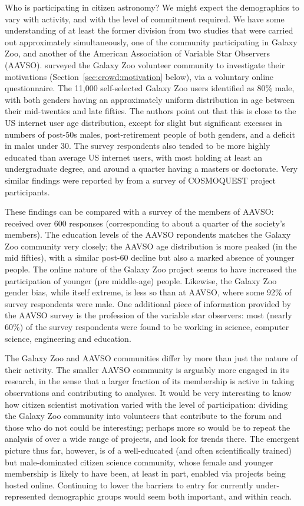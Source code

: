 \documentclass{ar2e}
\def\Sref#1{Section~\ref{#1}\xspace}
\begin{document}
Who is participating in citizen astronomy? We might expect the demographics to
vary with activity, and with the level of commitment required. We have some
understanding of at least the former division from two studies that were
carried out approximately simultaneously, one of the community  participating
in Galaxy Zoo, and another of the American Association of Variable Star
Observers (AAVSO).  \citet{Rad++2013} surveyed the Galaxy Zoo volunteer
community to investigate their motivations (\Sref{sec:crowd:motivation}
below), via a voluntary online questionnaire. The 11,000 self-selected Galaxy
Zoo users identified as 80\% male, with both genders having an approximately
uniform distribution in age between their mid-twenties and late fifties. The
authors point out that this is close to the US internet user age distribution,
except for slight but significant excesses in numbers of post-50s males,
post-retirement people of both genders, and a deficit in males under 30. The
survey respondents  also tended to be more highly educated than average US
internet users, with most holding at least an undergraduate degree, and around
a quarter having a masters or doctorate. Very similar findings were reported
by \citet{COSMOQUESTsurvey} from a survey of COSMOQUEST project participants.

These findings can be compared with a survey of the members of AAVSO:
\citet{P+P2012} received over 600 responses (corresponding to about a quarter
of the society's members). The education levels of
the AAVSO repondents matches the Galaxy Zoo community very closely; the AAVSO
age distribution is more peaked (in the mid fifties), with a similar post-60
decline but also a marked absence of younger people. The online nature of the
Galaxy Zoo project seems to have increased the participation of younger (pre
middle-age) people. Likewise, the Galaxy Zoo gender bias, while itself
extreme, is less so than at AAVSO, where some 92\% of survey respondents were
male. One additional piece of information provided by the AAVSO survey is the
profession of the variable star observers: most (nearly 60\%) of the survey
respondents were found to be working in science, computer science, engineering
and education. 

The Galaxy Zoo and AAVSO communities differ by more than just the nature of
their activity. The smaller AAVSO community is arguably more engaged in its
research, in the sense that a larger fraction of its membership is active in
taking observations and contributing to analyses. It would be very interesting
to know how citizen scientist motivation varied with the level of
participation: dividing the Galaxy Zoo community into volunteers that
contribute to the forum and those who do not could be interesting; perhaps
more so would be to repeat the analysis of \citeauthor{Rad++2013} over a wide
range of projects, and look for trends there. The emergent picture thus far,
however, is of a well-educated (and often scientifically trained)  but
male-dominated citizen science community, whose female and younger membership
is likely to have been, at least in part, enabled via projects being hosted
online. Continuing to lower the barriers to entry for currently
under-represented demographic groups would seem both important, and within
reach.
\end{document}

